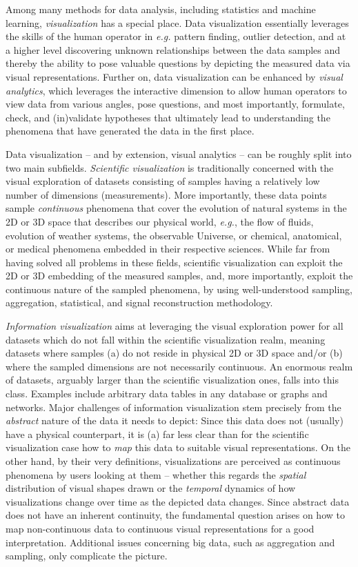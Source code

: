 Among many methods for data analysis, including statistics and machine learning, \emph{visualization} has a special place. Data visualization essentially leverages the skills of the human operator in \emph{e.g.} pattern finding, outlier detection, and at a higher level discovering unknown relationships between the data samples and thereby the ability to pose valuable questions by depicting the measured data via visual representations. Further on, data visualization can be enhanced by \emph{visual analytics}, which leverages the interactive dimension to allow human operators to view data from various angles, pose questions, and most importantly, formulate, check, and (in)validate hypotheses that ultimately lead to understanding the phenomena that have generated the data in the first place.

Data visualization -- and by extension, visual analytics -- can be roughly split into two main subfields. \emph{Scientific visualization} is traditionally concerned with the visual exploration of datasets consisting of samples having a relatively low number of dimensions (measurements). More importantly, these data points sample \emph{continuous} phenomena that cover the evolution of natural systems in the 2D or 3D space that describes our physical world, \emph{e.g.}, the flow of fluids, evolution of weather systems, the observable Universe, or chemical, anatomical, or medical phenomena embedded in their respective sciences. While far from having solved all problems in these fields, scientific visualization can exploit the 2D or 3D embedding of the measured samples, and, more importantly, exploit the continuous nature of the sampled phenomena, by using well-understood sampling, aggregation, statistical, and signal reconstruction methodology.

\emph{Information visualization} aims at leveraging the visual exploration power for all datasets which do not fall within the scientific visualization realm, meaning datasets where samples (a) do not reside in physical 2D or 3D space and/or (b) where the sampled dimensions are not necessarily continuous. An enormous realm of datasets, arguably larger than the scientific visualization ones, falls into this class. Examples include arbitrary data tables in any database or graphs and networks. Major challenges of information visualization stem precisely from the \emph{abstract} nature of the data it needs to depict: Since this data does not (usually) have a physical counterpart, it is (a) far less clear than for the scientific visualization case how to \emph{map} this data to suitable visual representations. On the other hand, by their very definitions, visualizations are perceived as continuous phenomena by users looking at them -- whether this regards the \emph{spatial} distribution of visual shapes drawn or the \emph{temporal} dynamics of how visualizations change over time as the depicted data changes. Since abstract data does not have an inherent continuity, the fundamental question arises on how to map non-continuous data to continuous visual representations for a good interpretation. Additional issues concerning big data, such as aggregation and sampling, only complicate the picture.

